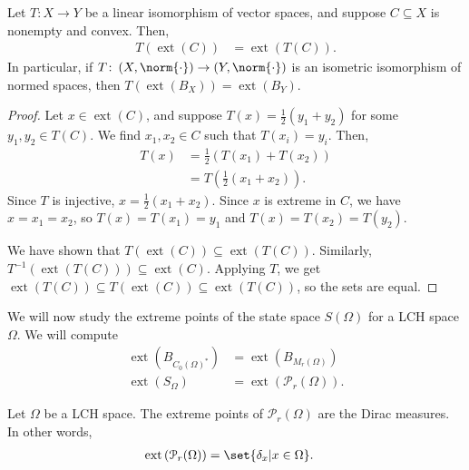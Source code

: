 \documentclass[10pt]{mypackage}
\begin{document}
\begin{lemma}
  Let $T\colon X\rightarrow Y$ be a linear isomorphism of vector spaces, and suppose $C\subseteq X$ is nonempty and convex. Then,
  \begin{align*}
    T\left(\operatorname{ext}\left(C\right)\right) &= \operatorname{ext}\left(T(C)\right).
  \end{align*}
  In particular, if $T\colon \left(X,\norm{\cdot}\right) \rightarrow \left(Y,\norm{\cdot}\right)$ is an isometric isomorphism of normed spaces, then $T\left(\operatorname{ext}\left(B_X\right)\right) = \operatorname{ext}\left(B_{Y}\right)$.
\end{lemma}
\begin{proof}
  Let $x\in \operatorname{ext}\left(C\right)$, and suppose $T(x) = \frac{1}{2}\left(y_1 + y_2\right)$ for some $y_1,y_2\in T(C)$. We find $x_1,x_2\in C$ such that $T\left(x_i\right) = y_i$. Then,
  \begin{align*}
    T\left(x\right) &= \frac{1}{2}\left(T\left(x_1\right) + T\left(x_2\right)\right)\\
                    &= T\left(\frac{1}{2}\left(x_1 + x_2\right)\right).
  \end{align*}
  Since $T$ is injective, $x = \frac{1}{2}\left(x_1 + x_2\right)$. Since $x$ is extreme in $C$, we have $x = x_1 = x_2$, so $T(x) = T\left(x_1\right) = y_1$ and $T(x) = T\left(x_2\right) = T\left(y_2\right)$.\newline

  We have shown that $T\left(\operatorname{ext}\left(C\right)\right)\subseteq \operatorname{ext}\left(T(C)\right)$. Similarly, $T^{-1}\left(\operatorname{ext}\left(T(C)\right)\right) \subseteq \operatorname{ext}(C)$. Applying $T$, we get $\operatorname{ext}\left(T(C)\right)\subseteq T\left(\operatorname{ext}(C)\right)\subseteq \operatorname{ext}\left(T(C)\right)$, so the sets are equal.
\end{proof}
We will now study the extreme points of the state space $S(\Omega)$ for a LCH space $\Omega$. We will compute
\begin{align*}
  \operatorname{ext}\left(B_{C_{0}(\Omega)^{\ast}}\right) &= \operatorname{ext}\left(B_{M_{r}(\Omega)}\right)\\
  \operatorname{ext}\left(S_{\Omega}\right) &= \operatorname{ext}\left(\mathcal{P}_{r}(\Omega)\right).
\end{align*}
\begin{theorem}
  Let $\Omega$ be a LCH space. The extreme points of $\mathcal{P}_{r}(\Omega)$ are the Dirac measures. In other words,
  \begin{align*}
    \operatorname{ext}\left(\mathcal{P}_{r}(\Omega)\right) &= \set{\delta_{x} | x\in\Omega}.
  \end{align*}
\end{theorem}
\end{document}
